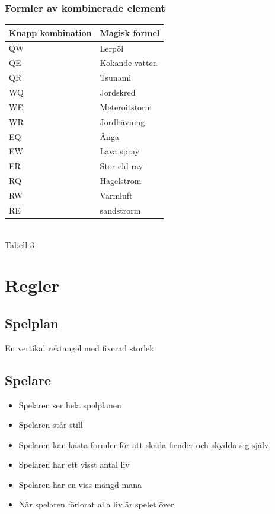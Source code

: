 \documentclass[12pt]{TDP005mall}
\begin{document}
\subsubsection{Formler av kombinerade element}
\begin{table}[H]
\begin{tabular}{|l|l|}
\hline
\textbf{Knapp kombination} & \textbf{Magisk formel} \\ \hline
QW             & Lerpöl                 \\ \hline
QE             & Kokande vatten         \\ \hline
QR             & Tsunami                \\ \hline
WQ             & Jordskred              \\ \hline
WE             & Meteroitstorm          \\ \hline
WR             & Jordbävning            \\ \hline
EQ             & Ånga                   \\ \hline
EW             & Lava spray             \\ \hline
ER             & Stor eld ray           \\ \hline
RQ             & Hagelstrom             \\ \hline
RW             & Varmluft               \\ \hline
RE             & sandstrorm             \\ \hline
\end{tabular}\\
Tabell 3

\end{table}

\clearpage


\section{Regler}
\subsection{Spelplan}
En vertikal rektangel med fixerad storlek
\subsection{Spelare}
\begin{itemize}
\item Spelaren ser hela spelplanen
\item Spelaren står still
\item Spelaren kan kasta formler för att skada fiender och skydda sig själv.
\item Spelaren har ett visst antal liv
\item Spelaren har en viss mängd mana
\item När spelaren förlorat alla liv är spelet över
\end{itemize}
\end{document}
